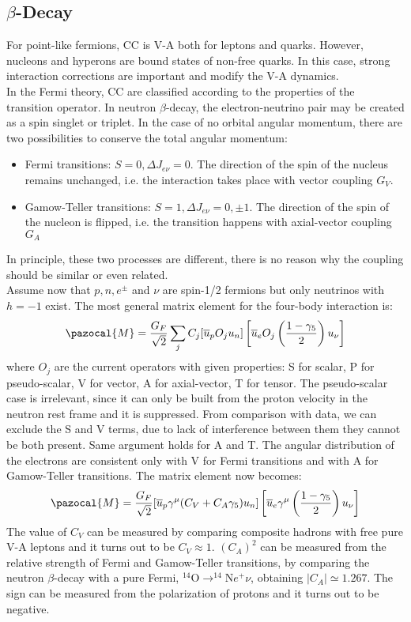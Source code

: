 \documentclass[10.75pt,a4paper,openright,bottom=2cm]{article}
\begin{document}
\subsection{$\beta$-Decay}
For point-like fermions, CC is V-A both for leptons and quarks. However, nucleons and hyperons are bound states of non-free quarks. In this case, strong interaction corrections are important and modify the V-A dynamics.\\
In the Fermi theory, CC are classified according to the properties of the transition operator. In neutron $\beta$-decay, the electron-neutrino pair may be created as a spin singlet or triplet. In the case of no orbital angular momentum, there are two possibilities to conserve the total angular momentum:
\begin{itemize}
    \item Fermi transitions: $S=0, \Delta J_{e\nu}=0$. The direction of the spin of the nucleus remains unchanged, i.e. the interaction takes place with vector coupling $G_V$.
    \item Gamow-Teller transitions: $S=1, \Delta J_{e\nu}=0,\pm1$. The direction of the spin of the nucleon is flipped, i.e. the transition happens with axial-vector coupling $G_A$
\end{itemize}
In principle, these two processes are different, there is no reason why the coupling should be similar or even related.\\
Assume now that $p,n, e^\pm$ and $\nu$ are spin-1/2 fermions but only neutrinos with $h=-1$ exist. The most general matrix element for the four-body interaction is:
\[
\pazocal{M}=\frac{G_F}{\sqrt{2}}\sum_j C_j[\overline{u}_pO_ju_n]\left[\overline{u}_eO_j\left(\frac{1-\gamma_5}{2}\right)u_\nu\right]
\]
where $O_j$ are the current operators with given properties: S for scalar, P for pseudo-scalar, V for vector, A for axial-vector, T for tensor. The pseudo-scalar case is irrelevant, since it can only be built from the proton velocity in the neutron rest frame and it is suppressed. From comparison with data, we can exclude the S and V terms, due to lack of interference between them they cannot be both present. Same argument holds for A and T. The angular distribution of the electrons are consistent only with V for Fermi transitions and with A for Gamow-Teller transitions. The matrix element now becomes:
\[
\pazocal{M}=\frac{G_F}{\sqrt{2}}[\overline{u}_p\gamma^\mu(C_V+C_A\gamma_5)u_n]\left[\overline{u}_e\gamma^\mu\left(\frac{1-\gamma_5}{2}\right)u_\nu\right]
\]
The value of $C_V$ can be measured by comparing composite hadrons with free pure V-A leptons and it turns out to be $C_V\approx1$. $(C_A)^2$ can be measured from the relative strength of Fermi and Gamow-Teller transitions, by comparing the neutron $\beta$-decay with a pure Fermi, $^{14}$O$\to^{14}$N$e^+\nu$, obtaining $|C_A|\simeq1.267$. The sign can be measured from the polarization of protons and it turns out to be negative.
\end{document}
